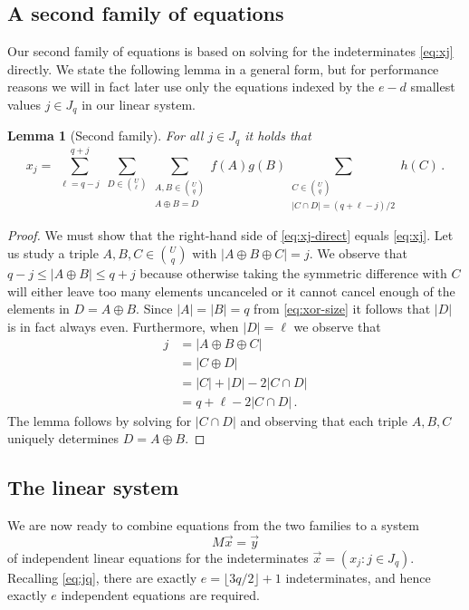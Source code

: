 \documentclass{amsart}
\newtheorem{Lem}{Lemma}
\begin{document}
\subsection{A second family of equations}

Our second family of equations is based on solving for the 
indeterminates \eqref{eq:xj} directly. We state the following
lemma in a general form, but for performance reasons we will 
in fact later use only the equations indexed by the $e-d$ smallest 
values $j\in J_q$ in our linear system.

\begin{Lem}[Second family]
\label{lem:second}
For all $j\in J_q$ it holds that
\begin{equation}
\label{eq:xj-direct}
x_j
=\!\!
\sum_{\substack{\ell=q-j}}^{q+j}
\sum_{D\in\binom{U}{\ell}}
\sum_{\substack{A,B\in\binom{U}{q}\\A\oplus B=D}}
f(A)g(B)
\!\!\!\!\!\!\!\!\!\!\!\!\sum_{\substack{C\in\binom{U}{q}\\|C\cap D|=(q+\ell-j)/2}}\!\!\!\!\!\!\!\!\!\!\!\!
h(C)\,.\!\!\!
\end{equation}
\end{Lem}
\begin{proof}
We must show that the right-hand side of \eqref{eq:xj-direct} equals
\eqref{eq:xj}. Let us study a triple $A,B,C\in\binom{U}{q}$ 
with $|A\oplus B\oplus C|=j$. We observe that $q-j\leq |A \oplus B|\leq q+j$ 
because otherwise taking the symmetric difference with $C$ will either 
leave too many elements uncanceled or it cannot cancel enough of 
the elements in $D=A\oplus B$. Since $|A|=|B|=q$ from \eqref{eq:xor-size} 
it follows that $|D|$ is in fact always even. 
Furthermore, when $|D|=\ell$ we observe that 
\[
\begin{split}
j&=|A\oplus B\oplus C|\\
&=|C\oplus D|\\
&=|C|+|D|-2|C\cap D|\\
&=q+\ell-2|C\cap D|\,.
\end{split}
\]
The lemma follows by solving for $|C\cap D|$ and observing that
each triple $A,B,C$ uniquely determines $D=A\oplus B$.
\end{proof}

\subsection{The linear system}
We are now ready to combine equations from the two families to a system 
\begin{equation}
\label{eq:sys}
M\vec x=\vec y 
\end{equation}
of independent linear equations for the indeterminates 
$\vec x=(x_j:j\in J_q)$. Recalling \eqref{eq:jq}, there are exactly
$e=\lfloor 3q/2\rfloor+1$ indeterminates, and hence exactly $e$
independent equations are required.
\end{document}
